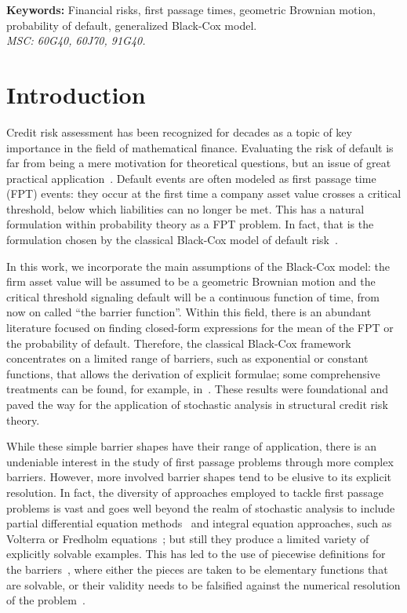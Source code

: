 \documentclass[12pt]{article}
\theoremstyle{definition}
\begin{document}
\noindent\textbf{Keywords:} Financial risks, first passage times, geometric Brownian motion, probability of default, generalized Black-Cox model.
\\  \textit{MSC: 60G40, 60J70, 91G40.}

\section{Introduction}

Credit risk assessment has been recognized for decades as a topic of key importance in the field of mathematical finance. Evaluating the risk of default is far from being a mere motivation for theoretical questions, but an issue of great practical application~\cite{credit2004bielecki}. Default events are often modeled as first passage time (FPT) events: they occur at the first time a company asset value crosses a critical threshold, below which liabilities can no longer be met. This has a natural formulation within probability theory as a FPT problem. In fact, that is the formulation chosen by the classical Black-Cox model of default risk~\cite{black1976valuing,brigo2009credit}.

In this work, we incorporate the main assumptions of the Black-Cox model: the firm asset value will be assumed to be a geometric Brownian motion and the critical threshold signaling default will be a continuous function of time, from now on called ``the barrier function''. Within this field,  there is an abundant literature focused on finding closed-form expressions for the mean of the FPT or the probability of default. Therefore, the classical Black-Cox framework concentrates on a limited range of barriers, such as exponential or constant functions, that allows the derivation of explicit formulae; some comprehensive treatments can be found, for example, in~\cite{bielecki2001credit,jeanblanc2009mathematical,karatzas1998methods}. These results were foundational and paved the way for the application of stochastic analysis in structural credit risk theory.

While these simple barrier shapes have their range of application, there is an undeniable interest in the study of first passage problems through more complex barriers. However, more involved barrier shapes tend to be elusive to its explicit resolution. In fact, the diversity of approaches employed to tackle first passage problems is vast and goes well beyond the realm of stochastic analysis to include partial differential equation methods~\cite{fox1986functional,tuckwell1984first} and integral equation approaches, such as Volterra or Fredholm equations~\cite{Jaimungal,peskir2006optimal}; but still they produce a limited variety of explicitly solvable examples. This has led to the use of piecewise definitions for the barriers~\cite{fu2010linear,guillaume2024computation,jin2017first}, where either the pieces are taken to be elementary functions that are solvable, or their validity needs to be falsified against the numerical resolution of the problem~\cite{fu2010linear}.
\end{document}
